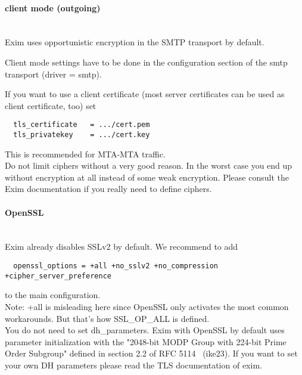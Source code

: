 \paragraph*{client mode (outgoing)}\mbox{}\\

Exim uses opportunistic encryption in the SMTP transport by default.

Client mode settings have to be done in the configuration section of the smtp transport (driver = smtp).

If you want to use a client certificate (most server certificates can be used as client certificate, too) set
\begin{lstlisting}
  tls_certificate   = .../cert.pem
  tls_privatekey    = .../cert.key
\end{lstlisting}
This is recommended for MTA-MTA traffic.\\

Do not limit ciphers without a very good reason. In the worst case you end up without encryption at all instead of some weak encryption. Please consult the Exim documentation if you really need to define ciphers.

\paragraph*{OpenSSL}\mbox{}\\
Exim already disables SSLv2 by default. We recommend to add
\begin{lstlisting}
  openssl_options = +all +no_sslv2 +no_compression +cipher_server_preference
\end{lstlisting}
to the main configuration.\\
Note: +all is misleading here since OpenSSL only activates the most common workarounds. But that's how SSL\_OP\_ALL is defined.\\

You do not need to set dh\_parameters. Exim with OpenSSL by default uses parameter initialization with the "2048-bit MODP Group with 224-bit Prime Order Subgroup" defined in section 2.2 of RFC 5114~\cite{rfc5114} (ike23).
If you want to set your own DH parameters please read the TLS documentation of exim.\\



